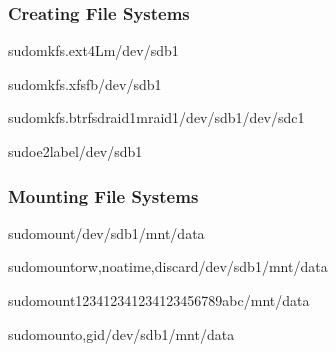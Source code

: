 \documentclass[letterpaper,10pt,english]{sphinxmanual}
\begin{document}
\subsubsection{Creating File Systems}
\label{\detokenize{file-systems:creating-file-systems}}
\begin{sphinxVerbatim}[commandchars=\\\{\}]
sudomkfs.ext4\PYGZhy{}L\PYGZhy{}m/dev/sdb1

sudomkfs.xfs\PYGZhy{}f\PYGZhy{}b/dev/sdb1

sudomkfs.btrfs\PYGZhy{}draid1\PYGZhy{}mraid1/dev/sdb1/dev/sdc1

sudoe2label/dev/sdb1
\end{sphinxVerbatim}


\subsubsection{Mounting File Systems}
\label{\detokenize{file-systems:mounting-file-systems}}
\begin{sphinxVerbatim}[commandchars=\\\{\}]
sudomount/dev/sdb1/mnt/data

sudomount\PYGZhy{}orw,noatime,discard/dev/sdb1/mnt/data

sudomount\PYGZhy{}1234\PYGZhy{}1234\PYGZhy{}1234\PYGZhy{}123456789abc/mnt/data

sudomount\PYGZhy{}o,gid/dev/sdb1/mnt/data
\end{sphinxVerbatim}
\end{document}
